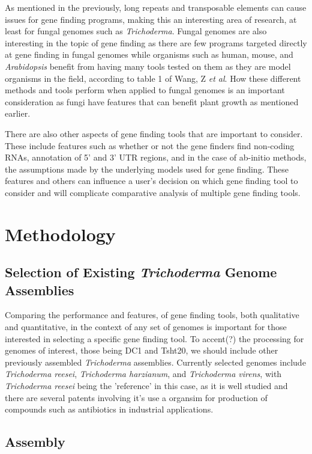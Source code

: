 \documentclass[12pt]{article}
\begin{document}
As mentioned in the previously, long repeats and transposable elements
can cause issues for gene finding programs, making this an interesting
area of research, at least for fungal genomes such as
\textit{Trichoderma}. Fungal genomes are also interesting in the topic
of gene finding as there are few programs targeted directly at gene
finding in fungal genomes while organisms such as human, mouse, and
\textit{Arabidopsis} benefit from having many tools tested on them as
they are model organisms in the field, according to table 1 of Wang, Z
\textit{et al}\cite{GeneFinding}. How these different methods and
tools perform when applied to fungal genomes is an important
consideration as fungi have features that can benefit plant growth as
mentioned earlier.

There are also other aspects of gene finding tools that are important
to consider. These include features such as whether or not the gene
finders find non-coding RNAs, annotation of 5' and 3' UTR regions, and
in the case of ab-initio methods, the assumptions made by the
underlying models used for gene finding. These features and others can
influence a user's decision on which gene finding tool to consider and
will complicate comparative analysis of multiple gene finding tools.

\section{Methodology}

\subsection{Selection of Existing \textit{Trichoderma} Genome Assemblies}

Comparing the performance and features, of gene finding tools, both
qualitative and quantitative, in the context of any set of genomes is
important for those interested in selecting a specific gene finding
tool. To accent(?) the processing for genomes of interest, those being
DC1 and Tsht20, we should include other previously assembled
\textit{Trichoderma} assemblies. Currently selected genomes include
\textit{Trichoderma reesei}, \textit{Trichoderma harzianum}, and
\textit{Trichoderma virens}, with \textit{Trichoderma reesei} being
the 'reference' in this case, as it is well studied and there are
several patents involving it's use a organsim for production of
compounds such as antibiotics in industrial applications.

\subsection{Assembly}
\end{document}
